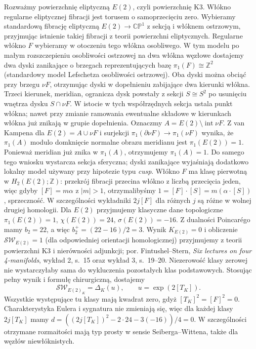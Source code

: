 Rozważmy powierzchnię eliptyczną $E(2)$,
czyli powierzchnię K3. Włókno regularne
eliptycznej fibracji jest torusem o samoprzecięciu
zero. Wybieramy standardową fibrację eliptyczną
$E(2)\to\mathbb{CP}^1$ z sekcją i włóknem
ostrzowym, przyjmując istnienie takiej fibracji
z teorii powierzchni eliptycznych. Regularne włókno
$F$ wybieramy w otoczeniu tego włókna osobliwego.
W tym modelu po małym rozszczepieniu osobliwości
ostrzowej na dwa włókna węzłowe dostajemy dwa dyski
zanikające o brzegach reprezentujących bazę
$\pi_1(F)\cong\mathbb Z^2$ (standardowy model
Lefschetza osobliwości ostrzowej).
Oba dyski można obciąć przy brzegu $\nu F$,
otrzymując dyski w dopełnieniu zabijające
dwa kierunki włókna. Trzeci kierunek, meridian,
ogranicza dysk powstały z sekcji $S\cong S^2$
po usunięciu wnętrza dysku $S\cap\nu F$.
W istocie w tych współrzędnych sekcja ustala
punkt włókna; nawet przy zmianie ramowania
ewentualne składowe w kierunkach włókna
już znikają w grupie dopełnienia.
Oznaczmy $A=E(2)\setminus\operatorname{int}\nu F$.
Z van Kampena dla $E(2)=A\cup\nu F$ i surjekcji
$\pi_1(\partial\nu F)\to\pi_1(\nu F)$ wynika,
że $\pi_1(A)$ modulo domknięcie normalne
obrazu meridianu jest $\pi_1(E(2))=1$.
Ponieważ meridian już znika w $\pi_1(A)$,
otrzymujemy $\pi_1(A)=1$. Do samego tego
wniosku wystarcza sekcja sferyczna; dyski
zanikające wyjaśniają dodatkowo lokalny model
używany przy hipotezie typu \emph{cusp}.
Włókno $F$ ma klasę pierwotną w
$H_2(E(2);\mathbb Z)$: przekrój fibracji przecina
włókno z liczbą przecięcia jeden, więc gdyby
$[F]=m\alpha$ z $|m|>1$, otrzymalibyśmy
$1=[F]\cdot[S]=m(\alpha\cdot[S])$, sprzeczność.
W szczególności wykładniki $2j[F]$ dla różnych $j$
są różne w wolnej drugiej homologii.
Dla $E(2)$ przyjmujemy klasyczne dane topologiczne
$\pi_1(E(2))=1$, $\chi(E(2))=24$, $\sigma(E(2))=-16$.
Z dualności Poincarégo mamy $b_2=22$,
a więc $b_2^+=(22-16)/2=3$.
Wynik $K_{E(2)}=0$ i obliczenie
$\mathcal{SW}_{E(2)}=1$ (dla odpowiedniej orientacji
homologicznej) przyjmujemy z teorii powierzchni K3
i nierówności adjunkcji; por. Fintushel--Stern,
\emph{Six lectures on four 4-manifolds},
wykład 2, s.~15 oraz wykład 3, s.~19--20.
Niezerowość klasy zerowej nie wystarczyłaby sama
do wykluczenia pozostałych klas podstawowych.
Stosując pełny wynik i formułę chirurgiczną, dostajemy
\[
\mathcal{SW}_{E(2)_K}=\Delta_K(u),
\qquad u=\exp(2[T_K]).
\]
Wszystkie występujące tu klasy mają kwadrat zero,
gdyż $[T_K]^2=[F]^2=0$. Charakterystyka Eulera
i sygnatura nie zmieniają się, więc dla każdej
klasy $2j[T_K]$ mamy
$d=((2j[T_K])^2-2\cdot24-3(-16))/4=0$.
W szczególności otrzymane rozmaitości mają typ prosty
w sensie Seiberga--Wittena, także dla węzłów
niewłóknistych.

